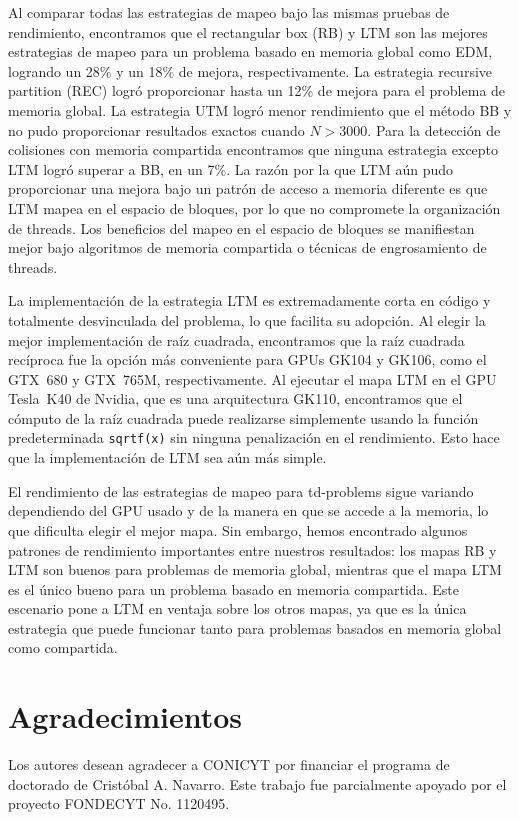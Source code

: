 \documentclass[twocolumn,10pt,a4paper]{article}
\begin{document}
Al comparar todas las estrategias de mapeo bajo las mismas pruebas de
rendimiento, encontramos que el rectangular box (RB) y LTM son las mejores
estrategias de mapeo para un problema basado en memoria global como EDM,
logrando un 28\% y un 18\% de mejora, respectivamente. La estrategia
recursive partition (REC) logró proporcionar hasta un 12\% de mejora para el
problema de memoria global. La estrategia UTM logró menor rendimiento que el
método BB y no pudo proporcionar resultados exactos cuando $N > 3000$. Para
la detección de colisiones con memoria compartida encontramos que ninguna
estrategia excepto LTM logró superar a BB, en un 7\%. La razón por la que
LTM aún pudo proporcionar una mejora bajo un patrón de acceso a memoria
diferente es que LTM mapea en el espacio de bloques, por lo que no compromete
la organización de threads. Los beneficios del mapeo en el espacio de bloques
se manifiestan mejor bajo algoritmos de memoria compartida o técnicas de
engrosamiento de threads.

La implementación de la estrategia LTM es extremadamente corta en código y
totalmente desvinculada del problema, lo que facilita su adopción. Al elegir
la mejor implementación de raíz cuadrada, encontramos que la raíz cuadrada
recíproca fue la opción más conveniente para GPUs GK104 y GK106, como el
GTX~680 y GTX~765M, respectivamente. Al ejecutar el mapa LTM en el GPU
Tesla~K40 de Nvidia, que es una arquitectura GK110, encontramos que el cómputo
de la raíz cuadrada puede realizarse simplemente usando la función predeterminada
\texttt{sqrtf(x)} sin ninguna penalización en el rendimiento. Esto hace que la
implementación de LTM sea aún más simple.

El rendimiento de las estrategias de mapeo para td-problems sigue variando
dependiendo del GPU usado y de la manera en que se accede a la memoria, lo que
dificulta elegir el mejor mapa. Sin embargo, hemos encontrado algunos patrones
de rendimiento importantes entre nuestros resultados: los mapas RB y LTM son
buenos para problemas de memoria global, mientras que el mapa LTM es el único
bueno para un problema basado en memoria compartida. Este escenario pone a LTM
en ventaja sobre los otros mapas, ya que es la única estrategia que puede
funcionar tanto para problemas basados en memoria global como compartida.

\section*{Agradecimientos}

Los autores desean agradecer a CONICYT por financiar el programa de doctorado
de Crist\'obal A. Navarro. Este trabajo fue parcialmente apoyado por el
proyecto FONDECYT No. 1120495.


\end{document}
